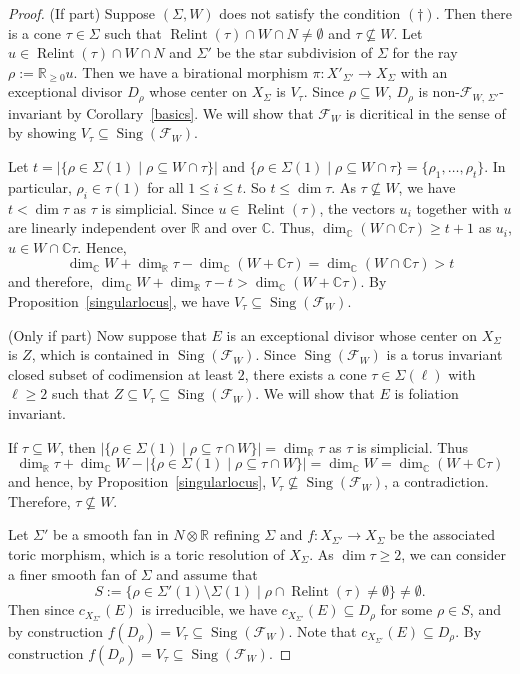 \documentclass[12pt,reqno]{amsart}
\theoremstyle{definition}
\newcommand{\on}{\operatorname}
\newcommand\cF{{\mathcal{F}}}
\newcommand\bC{{\mathbb C}}
\newcommand\bR{{\mathbb R}}
\begin{document}
\begin{proof}
    (If part) Suppose $(\Sigma,W)$ does not satisfy the condition $(\dagger)$. 
    Then there is a cone $\tau\in\Sigma$ such that $\on{Relint}(\tau)\cap W\cap N\neq\emptyset$ and $\tau\nsubseteq W$. 
    Let $u\in\on{Relint}(\tau)\cap W\cap N$ and $\Sigma'$ be the star subdivision of $\Sigma$ for the ray $\rho := \bR_{\geq 0}u$. 
    Then we have a birational morphism $\pi\colon X'_{\Sigma'} \to X_\Sigma$ with an exceptional divisor $D_\rho$ whose center on $X_\Sigma$ is $V_\tau$. 
    Since $\rho\subseteq W$, $D_\rho$ is non-$\cF_{W,\,\Sigma'}$-invariant by Corollary~\ref{basics}. 
    We will show that $\cF_W$ is dicritical in the sense of \cite[Definition 3.6]{wang2023toric} by showing $V_\tau\subseteq\on{Sing}(\cF_W)$. 
    
    Let $t=|\{\rho\in\Sigma(1)\mid \rho\subseteq W\cap\tau\}|$ and $\{\rho\in\Sigma(1)\mid \rho\subseteq W\cap\tau\} = \{\rho_1,\ldots,\rho_t\}$. 
    In particular, $\rho_i\in\tau(1)$ for all $1\leq i\leq t$. 
    So $t\leq \dim\tau$. 
    As $\tau\nsubseteq W$, we have $t<\dim\tau$ as $\tau$ is simplicial. 
    Since $u\in\on{Relint}(\tau)$, the vectors $u_i$ together with $u$ are linearly independent over $\bR$ and over $\bC$. 
    Thus, $\dim_\bC(W\cap\bC\tau)\geq t+1$ as $u_i$, $u\in W\cap\bC\tau$. 
    Hence, 
    \[\dim_\bC W + \dim_\bR\tau - \dim_\bC(W+\bC\tau) = \dim_\bC(W\cap\bC\tau) > t\] 
    and therefore, $\dim_\bC W+\dim_\bR\tau - t > \dim_\bC(W+\bC\tau)$. 
    By Proposition~\ref{singularlocus}, we have $V_\tau\subseteq\on{Sing}(\cF_W)$. 

    (Only if part) Now suppose that $E$ is an exceptional divisor whose center on $X_\Sigma$ is $Z$, which is contained in $\on{Sing}(\cF_W)$. 
    Since $\on{Sing}(\cF_W)$ is a torus invariant closed subset of codimension at least $2$, there exists a cone $\tau\in\Sigma(\ell)$ with $\ell\geq 2$ such that $Z\subseteq V_\tau\subseteq\on{Sing}(\cF_W)$. 
    We will show that $E$ is foliation invariant. 

    If $\tau\subseteq W$, then $|\{\rho\in\Sigma(1)\mid\rho\subseteq\tau\cap W\}| = \dim_\bR\tau$ as $\tau$ is simplicial. 
    Thus 
    \[\dim_\bR\tau+\dim_\bC W - |\{\rho\in\Sigma(1)\mid\rho\subseteq\tau\cap W\}| = \dim_\bC W = \dim_\bC(W+\bC\tau)\] 
    and hence, by Proposition~\ref{singularlocus}, $V_\tau\nsubseteq\on{Sing}(\cF_W)$, a contradiction.  
    Therefore, $\tau\nsubseteq W$. 
    
    Let $\Sigma'$ be a smooth fan in $N\otimes\bR$ refining $\Sigma$ and $f\colon X_{\Sigma'}\to X_{\Sigma}$ be the associated toric morphism, which is a toric resolution of $X_\Sigma$. 
    As $\dim\tau\geq 2$, we can consider a finer smooth fan of $\Sigma$ and assume that \[S:=\{\rho\in\Sigma'(1)\setminus\Sigma(1)\mid \rho\cap\on{Relint}(\tau)\neq\emptyset\}\neq\emptyset.\] 
    Then since $c_{X_{\Sigma'}}(E)$ is irreducible, we have $c_{X_{\Sigma'}}(E)\subseteq D_\rho$ for some $\rho\in S$, and by construction $f(D_\rho)=V_\tau\subseteq\on{Sing}(\cF_W)$. 
    Note that $c_{X_{\Sigma'}}(E)\subseteq D_\rho$. 
    By construction $f(D_\rho)=V_\tau\subseteq\on{Sing}(\cF_W)$. 
    

\end{proof}
\end{document}
